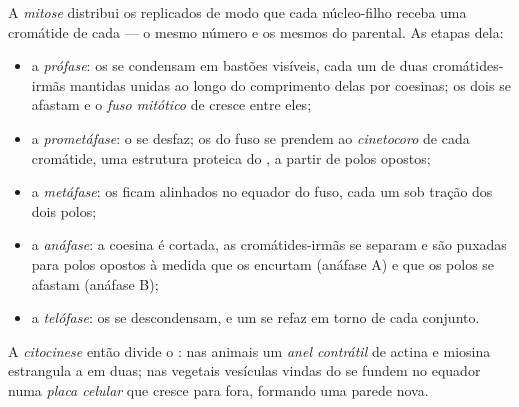 \begin{definition}[Mitose]\label{def:b1:replication-mitosis:mitosis}
A \emph{mitose} distribui os  replicados de modo que cada
núcleo-filho receba uma cromátide de cada  --- o mesmo número
e os mesmos  do parental. As etapas dela:
\begin{itemize}
  \item a \emph{prófase}: os  se condensam em bastões
        visíveis, cada um de duas cromátides-irmãs mantidas unidas ao
        longo do comprimento delas por  coesinas; os dois
        \emph{} se afastam e o \emph{fuso mitótico} de
         cresce entre eles;
  \item a \emph{prometáfase}: o  se desfaz; os
         do fuso se prendem ao \emph{cinetocoro} de cada
        cromátide, uma estrutura proteica do , a partir de
        polos opostos;
  \item a \emph{metáfase}: os  ficam alinhados no equador do
        fuso, cada um sob tração dos dois polos;
  \item a \emph{anáfase}: a coesina é cortada, as cromátides-irmãs se
        separam e são puxadas para polos opostos à medida que os
         encurtam (anáfase A) e que os polos se afastam
        (anáfase B);
  \item a \emph{telófase}: os  se descondensam, e um
         se refaz em torno de cada conjunto.
\end{itemize}
A \emph{citocinese} então divide o : nas  animais um
\emph{anel contrátil} de actina e miosina estrangula a  em duas;
nas  vegetais vesículas vindas do  se fundem no equador
numa \emph{placa celular} que cresce para fora, formando uma parede
nova.
\end{definition}

